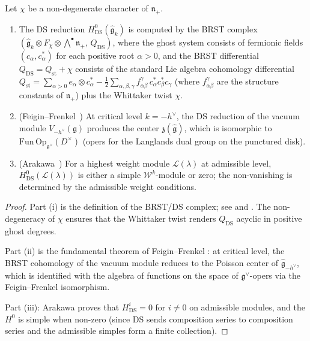 \begin{proposition}
\label{prop:whittaker-ds}
Let $\chi$ be a non-degenerate character of $\mathfrak{n}_+$.
\begin{enumerate}[label=\textup{(\roman*)}]
\item The DS reduction
  $H^0_{\mathrm{DS}}(\widehat{\mathfrak{g}}_k)$ is computed by
  the BRST complex
  $(\widehat{\mathfrak{g}}_k \otimes F_\chi \otimes
  \bigwedge^\bullet \mathfrak{n}_+,\, Q_{\mathrm{DS}})$,
  where the ghost system consists of fermionic fields
  $(c_\alpha, c^*_\alpha)$ for each positive root $\alpha > 0$,
  and the BRST differential
  $Q_{\mathrm{DS}} = Q_{\mathrm{st}} + \chi$ consists of the
  standard Lie algebra cohomology differential
  $Q_{\mathrm{st}} = \sum_{\alpha > 0} e_\alpha \otimes
  c^*_\alpha - \frac{1}{2}\sum_{\alpha,\beta,\gamma}
  f^{\gamma}_{\alpha\beta}\, c^*_\alpha c^*_\beta c_\gamma$
  (where $f^{\gamma}_{\alpha\beta}$ are the structure constants
  of $\mathfrak{n}_+$) plus the Whittaker twist $\chi$.
\item \textup{(}Feigin--Frenkel~\cite{FF}\textup{)} At critical
  level $k = -h^\vee$, the DS reduction of the
  vacuum module $V_{-h^\vee}(\mathfrak{g})$ produces the center
  $\mathfrak{z}(\widehat{\mathfrak{g}})$, which is isomorphic
  to $\mathrm{Fun}\,\mathrm{Op}_{\mathfrak{g}^\vee}(D^\times)$
  \textup{(}opers for the Langlands dual group on the
  punctured disk\textup{)}.
\item \textup{(}Arakawa~\cite{Arakawa17}\textup{)} For a
  highest weight module $\mathcal{L}(\lambda)$ at admissible
  level, $H^0_{\mathrm{DS}}(\mathcal{L}(\lambda))$ is either
  a simple $\mathcal{W}^k$-module or zero; the non-vanishing
  is determined by the admissible weight conditions.
\end{enumerate}
\end{proposition}

\begin{proof}
Part (i) is the definition of the BRST/DS complex; see
\cite{FF} and \cite{KRW}.  The non-degeneracy of $\chi$
ensures that the Whittaker twist renders $Q_{\mathrm{DS}}$
acyclic in positive ghost degrees.

Part (ii) is the fundamental theorem of Feigin--Frenkel
\cite{FF}: at critical level, the BRST cohomology of the
vacuum module reduces to the Poisson center of
$\widehat{\mathfrak{g}}_{-h^\vee}$, which is identified with
the algebra of functions on the space of $\mathfrak{g}^\vee$-opers
via the Feigin--Frenkel isomorphism.

Part (iii): Arakawa proves that $H^i_{\mathrm{DS}} = 0$ for
$i \neq 0$ on admissible modules, and the $H^0$ is simple
when non-zero (since DS sends composition series to
composition series and the admissible simples form a finite
collection).
\end{proof}

